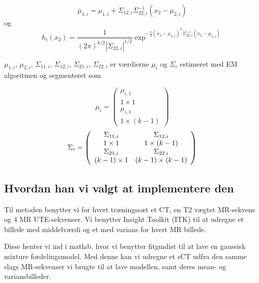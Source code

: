 \begin{equation}
 \bar{\mu}_{1,i} = \mu_{1,i} + \Sigma_{1 2, i} \Sigma^{-1}_{22, i}(x_2 - \mu_{2,i})
\end{equation}
og
\begin{equation}
h_i(x_2)= \frac{1}{( 2 \pi )^{k/2}|\Sigma_{22,i}|^{1/2}}\exp^{-\frac{1}{2}(x_2 - \mu_{2,i})^T \Sigma^{-1}_{22, i}(x_2 - \mu_{2,i})}
\end{equation}

$\mu_{1,i}$, $\mu_{2,i}$, $\Sigma_{1 1, i}$, $\Sigma_{1 2, i}$, $\Sigma_{2 1, i}$, $\Sigma_{2 2, i}$ er værdierne $\mu_i$ og $\Sigma_i$ estimeret med EM algoritmen og segmenteret som

\begin{equation}
\mu_i = \left(\begin{array}{c}
\mu_{i,1} \\ 1 \times 1 \\
\mu_{i,1} \\ 1 \times (k - 1)  
\end{array}\right)
\end{equation} 
\begin{equation}
\Sigma_i = \left(\begin{array}{c c}
\Sigma_{11,i} & \Sigma_{12,i} \\ 1 \times 1  & 1 \times (k-1)\\
\Sigma_{21,i} & \Sigma_{22,i} \\ (k-1) \times 1  & (k-1) \times (k-1)\\  
\end{array}\right)
\end{equation}


\subsection{Hvordan han vi valgt at implementere den}


Til metoden benytter vi for hvert træningssæt et CT, en T2 vægtet MR-sekvens
og 4 MR UTE-sekvenser. Vi benytter Insight Toolkit (ITK) til at udregne et
billede med middelværdi og et med varians for hvert MR billede.

Disse henter vi ind i matlab, hvor vi benytter fitgmdist til at lave en
gaussisk mixture fordelingsmodel. Med denne kan vi udregne et sCT udfra den
samme slags MR-sekvenser vi brugte til at lave modellen, samt deres
mean- og variansbilleder.
